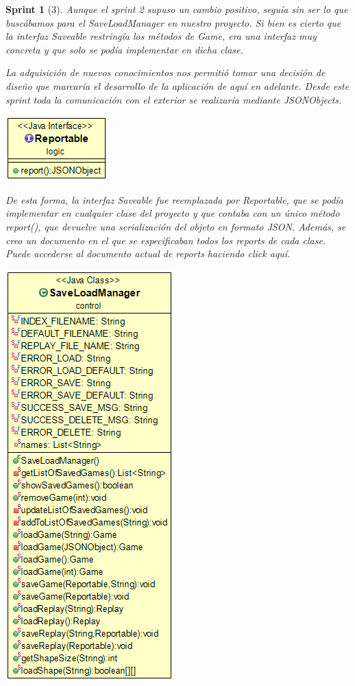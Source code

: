 \documentclass{article}
\theoremstyle{break}
\newtheorem*{sprint}{Sprint}
\begin{document}
\begin{sprint}[3]
Aunque el sprint 2 supuso un cambio positivo, seguía sin ser lo que buscábamos para el \textit{SaveLoadManager} en nuestro proyecto. Si bien es cierto que la interfaz \textit{Saveable} restringía los métodos de \textit{Game}, era una interfaz muy concreta y que solo se podía implementar en dicha clase.

La adquisición de nuevos conocimientos nos permitió tomar una decisión de diseño que marcaría el desarrollo de la aplicación de aquí en adelante. Desde este sprint toda la comunicación con el exterior se realizaría mediante JSONObjects.

\begin{center}
\centering
\includegraphics[scale=0.5]{reportable.png}
\end{center}

De esta forma, la interfaz \textit{Saveable} fue reemplazada por \textit{Reportable}, que se podía implementar en cualquier clase del proyecto y que contaba con un único método \textit{report()}, que devuelve una serialización del objeto en formato JSON. Además, se creo un documento en el que se especificaban todos los reports de cada clase. Puede accederse al documento actual de reports haciendo click aquí. %


\begin{center}
\centering
\includegraphics[scale=0.5]{save-load-manager-sprint3.png}
\end{center}


\end{sprint}
\end{document}
